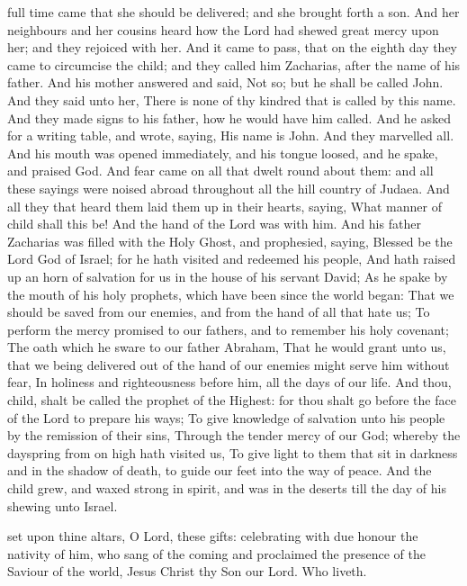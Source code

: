  full time came that she should be delivered; and she brought forth a son. And her neighbours and her cousins heard how the Lord had shewed great mercy upon her; and they rejoiced with her. And it came to pass, that on the eighth day they came to circumcise the child; and they called him Zacharias, after the name of his father. And his mother answered and said, Not so; but he shall be called John. And they said unto her, There is none of thy kindred that is called by this name. And they made signs to his father, how he would have him called. And he asked for a writing table, and wrote, saying, His name is John. And they marvelled all. And his mouth was opened immediately, and his tongue loosed, and he spake, and praised God. And fear came on all that dwelt round about them: and all these sayings were noised abroad throughout all the hill country of Judaea. And all they that heard them laid them up in their hearts, saying, What manner of child shall this be! And the hand of the Lord was with him. And his father Zacharias was filled with the Holy Ghost, and prophesied, saying, Blessed be the Lord God of Israel; for he hath visited and redeemed his people, And hath raised up an horn of salvation for us in the house of his servant David; As he spake by the mouth of his holy prophets, which have been since the world began: That we should be saved from our enemies, and from the hand of all that hate us; To perform the mercy promised to our fathers, and to remember his holy covenant; The oath which he sware to our father Abraham, That he would grant unto us, that we being delivered out of the hand of our enemies might serve him without fear, In holiness and righteousness before him, all the days of our life. And thou, child, shalt be called the prophet of the Highest: for thou shalt go before the face of the Lord to prepare his ways; To give knowledge of salvation unto his people by the remission of their sins, Through the tender mercy of our God; whereby the dayspring from on high hath visited us, To give light to them that sit in darkness and in the shadow of death, to guide our feet into the way of peace. And the child grew, and waxed strong in spirit, and was in the deserts till the day of his shewing unto Israel.


\secret\label{JohnSecret}
 set upon thine altars, O Lord, these gifts: celebrating with due honour the nativity of him, who sang of the coming and proclaimed the presence of the Saviour of the world, Jesus Christ thy Son our Lord. Who liveth.

